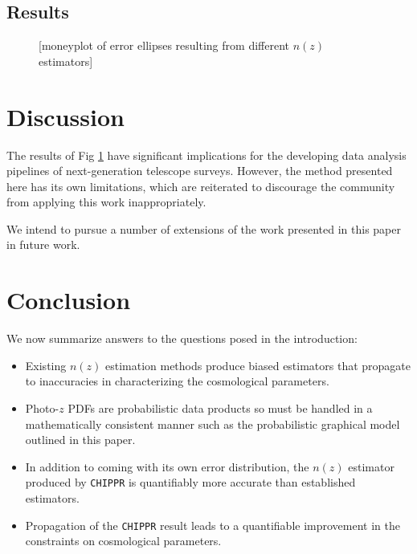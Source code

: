 \documentclass[iop]{emulateapj}
\newcommand{\chippr}{\texttt{CHIPPR} }
\begin{document}

\subsection{Results}
\label{sec:results}

\begin{figure}
	\begin{center}
		\caption{[moneyplot of error ellipses resulting from different $n(z)$ estimators]}
		\label{fig:money}
	\end{center}
\end{figure}

\section{Discussion}
\label{sec:discussion}

The results of Fig \ref{fig:money} have significant implications for the developing data analysis pipelines of next-generation telescope surveys.  However, the method presented here has its own limitations, which are reiterated to discourage the community from applying this work inappropriately.

We intend to pursue a number of extensions of the work presented in this paper in future work.

\section{Conclusion}
\label{sec:conclusion}

We now summarize answers to the questions posed in the introduction:

\begin{itemize}
	\item Existing $n(z)$ estimation methods produce biased estimators that propagate to inaccuracies in characterizing the cosmological parameters.
	\item Photo-$z$ PDFs are probabilistic data products so must be handled in a mathematically consistent manner such as the probabilistic graphical model outlined in this paper.
	\item In addition to coming with its own error distribution, the $n(z)$ estimator produced by \chippr is quantifiably more accurate than established estimators.
	\item Propagation of the \chippr result leads to a quantifiable improvement in the constraints on cosmological parameters.
\end{itemize}
\end{document}
